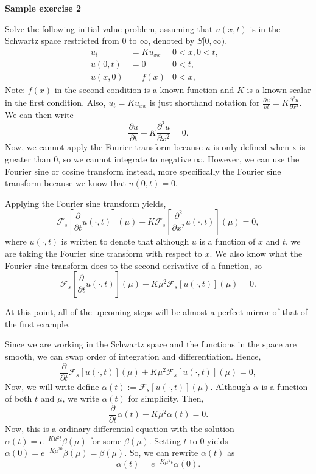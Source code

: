 \textbf{Sample exercise 2}

Solve the following initial value problem, assuming that $u(x,t)$ is in the Schwartz space restricted from 0 to $\infty$, denoted by $S[0,\infty)$.
\begin{align*}
u_t &= Ku_{xx} & 0 < x, 0 < t ,&\\
u(0,t) &= 0 &0 < t,&\\
u(x,0) &= f(x) & 0 < x, &
\end{align*}
Note: $f(x)$ in the second condition is a known function and $K$ is a known scalar in the first condition. Also, $u_t = Ku_{xx}$ is just shorthand notation for $\frac{\partial u}{\partial t} = K\frac{\partial^2 u}{\partial x^2}$.
We can then write
$$\frac{\partial u}{\partial t} - K\frac{\partial^2 u}{\partial x^2} = 0.$$
Now, we cannot apply the Fourier transform because $u$ is only defined when x is greater than 0, so we cannot integrate to negative $\infty$. However, we can use the Fourier sine or cosine transform instead, more specifically the Fourier sine transform because we know that $u(0,t) = 0$.

Applying the Fourier sine transform yields,
$$\mathcal{F}_s\left[\frac{\partial}{\partial t} u(\cdot,t)\right](\mu) - K \mathcal{F}_s\left[\frac{\partial^2}{\partial x^2} u(\cdot,t) \right](\mu) = 0,$$
where $u(\cdot,t)$ is written to denote that although $u$ is a function of $x$ and $t$, we are taking the Fourier sine transform with respect to $x$. We also know what the Fourier sine transform does to the second derivative of a function, so
$$\mathcal{F}_s\left[\frac{\partial}{\partial t} u(\cdot,t)\right](\mu) + K\mu^2 \mathcal{F}_s\left[ u(\cdot,t) \right](\mu) = 0.$$	

At this point, all of the upcoming steps will be almost a perfect mirror of that of the first example.

Since we are working in the Schwartz space and the functions in the space are smooth, we can swap order of integration and differentiation. 
Hence,
$$\frac{\partial}{\partial t}\mathcal{F}_s\left[u(\cdot,t)\right](\mu) + K\mu^2 \mathcal{F}_s\left[ u(\cdot,t) \right](\mu) = 0,$$
Now, we will write define $\alpha(t) := \mathcal{F}_s\left[u(\cdot,t)\right](\mu)$. Although $\alpha$ is a function of both $t$ and $\mu$, we write $\alpha(t)$ for simplicity. Then,
$$\frac{\partial}{\partial t}\alpha(t) + K\mu^2 \alpha(t) = 0.$$
Now, this is a ordinary differential equation with the solution $\alpha(t) = e^{-K\mu^2t}\beta(\mu)$ for some $\beta(\mu)$. Setting $t$ to 0 yields
$\alpha(0) = e^{-K\mu^20}\beta(\mu) = \beta(\mu)$. So, we can rewrite $\alpha(t)$ as
$$\alpha(t) = e^{-K\mu^2t}\alpha(0).$$

